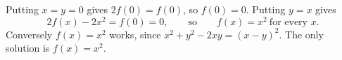 Putting $x=y=0$ gives $2f(0)=f(0)$, so $f(0)=0$. Putting $y=x$ gives
\[2f(x)-2x^2=f(0)=0,\qquad\text{so}\qquad f(x)=x^2\ \text{for every }x.\]
Conversely $f(x)=x^2$ works, since $x^2+y^2-2xy=(x-y)^2$. The only solution is $\boxed{f(x)=x^2}$.
